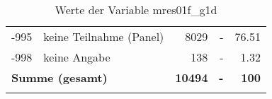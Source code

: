 \begin{longtable}{Xlrrr}
       -995 & keine Teilnahme (Panel) & \num{8029} & - & \num[round-mode=places,round-precision=2]{76.51} \\

       -998 & keine Angabe & \num{138} & - & \num[round-mode=places,round-precision=2]{1.32} \\

     \midrule
     \multicolumn{2}{l}{\textbf{Summe (gesamt)}} & \textbf{\num{10494}} & \textbf{-} & \textbf{\num{100}} \\
     \bottomrule
     \caption{Werte der Variable mres01f\_g1d}
     \end{longtable}
     
